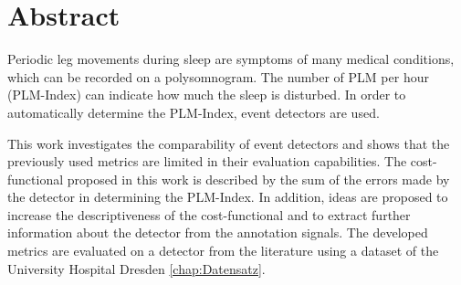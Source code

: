 \section{Abstract}

Periodic leg movements during sleep are symptoms of many medical conditions, which can be recorded on a polysomnogram. The number of PLM per hour (PLM-Index) can indicate how much the sleep is disturbed. In order to automatically determine the PLM-Index, event detectors are used. 

This work investigates the comparability of event detectors and shows that the previously used metrics are limited in their evaluation capabilities. The cost-functional proposed in this work is described by the sum of the errors made by the detector in determining the PLM-Index. 
In addition, ideas are proposed to increase the descriptiveness of the cost-functional and to extract further information about the detector from the annotation signals.
The developed metrics are evaluated on a detector from the literature \cite{Moore} using a dataset of the University Hospital Dresden \ref{chap:Datensatz}. 
